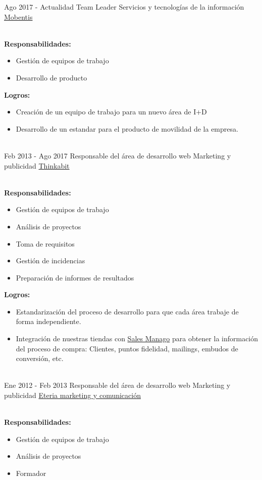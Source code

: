 \documentclass[letterpaper]{twentysecondcv} %
\begin{document}
\begin{twenty} %
	\twentyitem%
	{Ago 2017 -}
	{Actualidad}
	{Team Leader}
	{Servicios y tecnologías de la información}
	{\href{http://www.mobentis.com/}{Mobentis}}
	{\\
		\textbf{Responsabilidades:}
		\begin{itemize}
			\item Gestión de equipos de trabajo
			\item Desarrollo de producto
		\end{itemize}

		\textbf{Logros:}
		\begin{itemize}
			\item Creación de un equipo de trabajo para un nuevo área de I+D
			\item Desarrollo de un estandar para el producto de movilidad de la empresa.
		\end{itemize}
	}
	\\
    	\twentyitem%
	{Feb 2013 -}
	{Ago 2017}
	{Responsable del área de desarrollo web}
	{Marketing y publicidad}
	{\href{http://www.thinkabit.es/}{Thinkabit}}
	{\\
		\textbf{Responsabilidades:}
		\begin{itemize}
			\item Gestión de equipos de trabajo
			\item Análisis de proyectos
			\item Toma de requisitos
			\item Gestión de incidencias
			\item Preparación de informes de resultados
		\end{itemize}

		\textbf{Logros:}
		\begin{itemize}
			\item Estandarización del proceso de desarrollo para que cada área trabaje de forma independiente.
			\item Integración de nuestras tiendas con \href{http://salesmanago.com/}{Sales Manago} para obtener la información del proceso de compra: Clientes, puntos fidelidad, mailings, embudos de conversión, etc.
		\end{itemize}
	}
	\\
	\twentyitem%
	{Ene 2012 -}
	{Feb 2013}
	{Responsable del área de desarrollo web}
	{Marketing y publicidad}
	{\href{http://www.eteria.es}{Eteria marketing y comunicación}}
	{\\
		\textbf{Responsabilidades:}
		\begin{itemize}
			\item Gestión de equipos de trabajo
			\item Análisis de proyectos
			\item Formador
		\end{itemize}

}
\end{twenty}
\end{document}
